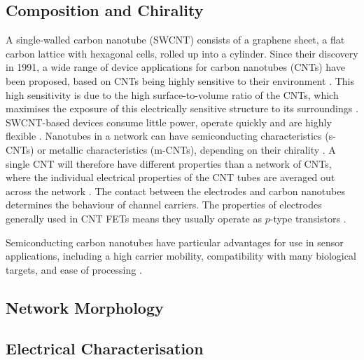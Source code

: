 \documentclass[
  a4paper,
]{scrbook}
\begin{document}
\hypertarget{composition-and-chirality}{%
\subsection{Composition and Chirality}\label{composition-and-chirality}}

A single-walled carbon nanotube (SWCNT) consists of a graphene sheet, a
flat carbon lattice with hexagonal cells, rolled up into a cylinder.
Since their discovery in 1991, a wide range of device applications for
carbon nanotubes (CNTs) have been proposed, based on CNTs being highly
sensitive to their environment
\autocite{Iijima1991,Battie2010,Boyd2014,Chen2019}. This high
sensitivity is due to the high surface-to-volume ratio of the CNTs,
which maximises the exposure of this electrically sensitive structure to
its surroundings \autocite{Yao2021,Shkodra2021}. SWCNT-based devices
consume little power, operate quickly and are highly flexible
\autocite{Chen2019,Shkodra2021}. Nanotubes in a network can have
semiconducting characteristics (s-CNTs) or metallic characteristics
(m-CNTs), depending on their chirality \autocite{Martel1998,Kong2000}. A
single CNT will therefore have different properties than a network of
CNTs, where the individual electrical properties of the CNT tubes are
averaged out across the network \autocite{Battie2010}. The contact
between the electrodes and carbon nanotubes determines the behaviour of
channel carriers. The properties of electrodes generally used in CNT
FETs means they usually operate as \(p\)-type transistors
\autocite{Yao2021}.

Semiconducting carbon nanotubes have particular advantages for use in
sensor applications, including a high carrier mobility, compatibility
with many biological targets, and ease of processing
\autocite{Shkodra2021}.

\hypertarget{network-morphology}{%
\subsection{Network Morphology}\label{network-morphology}}

\hypertarget{sec-electrical-characterisation-CNT}{%
\subsection{Electrical
Characterisation}\label{sec-electrical-characterisation-CNT}}
\end{document}
